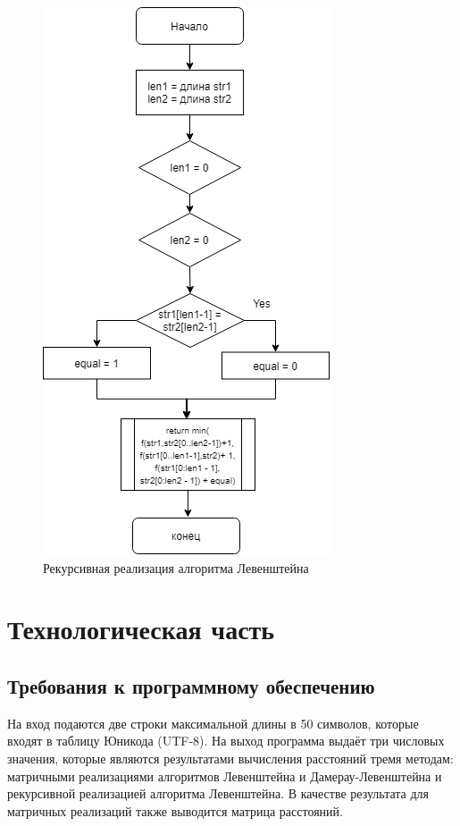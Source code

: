 \documentclass[12pt, a4paper]{report}
\begin{document}
	\begin{figure}
		\centering
		\includegraphics[scale=0.7]{Dia3.png}
		\caption{Рекурсивная реализация алгоритма Левенштейна}
		\label{fig:damlevenr}
	\end{figure}

	\newpage
	
	\chapter{Технологическая часть}
	\section{Требования к программному обеспечению}
	На вход подаются две строки максимальной длины в 50 символов, которые входят в таблицу Юникода (UTF-8). На выход программа выдаёт три числовых значения, которые являются результатами вычисления расстояний тремя методам: матричными реализациями алгоритмов Левенштейна и Дамерау-Левенштейна и рекурсивной реализацией алгоритма Левенштейна. В качестве результата для матричных реализаций также выводится матрица расстояний.
\end{document}
